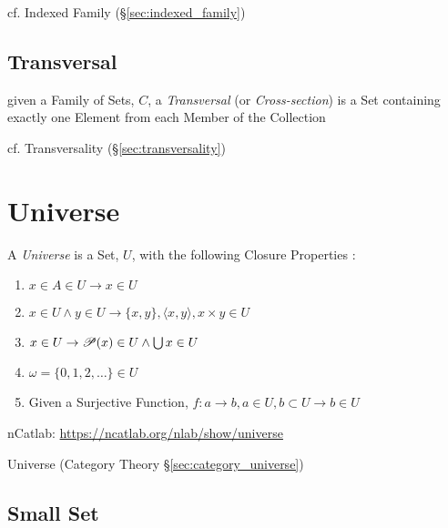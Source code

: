 \fist cf. Indexed Family (\S\ref{sec:indexed_family})



\subsection{Transversal}\label{sec:transversal}

given a Family of Sets, $C$, a \emph{Transversal} (or \emph{Cross-section}) is a
Set containing exactly one Element from each Member of the Collection

cf. Transversality (\S\ref{sec:transversality})



\section{Universe}\label{sec:set_universe}

A \emph{Universe} is a Set, $U$, with the following Closure Properties
\cite{maclane69}:
\begin{enumerate}
\item $x \in A \in U \to x \in U$
\item $x \in U \wedge y \in U \to \{x,y\}, \langle x,y
  \rangle, x \times y \in U$
\item $x \in U \to \mathscr{P}(x) \in U \wedge \bigcup x \in U$
\item $\omega = \{0,1,2,\ldots\} \in U$
\item Given a Surjective Function, $f : a \to b, a \in
  U, b \subset U \to b \in U$
\end{enumerate}

nCatlab: \url{https://ncatlab.org/nlab/show/universe}

\fist Universe (Category Theory \S\ref{sec:category_universe})




\subsection{Small Set}\label{sec:small_set}

